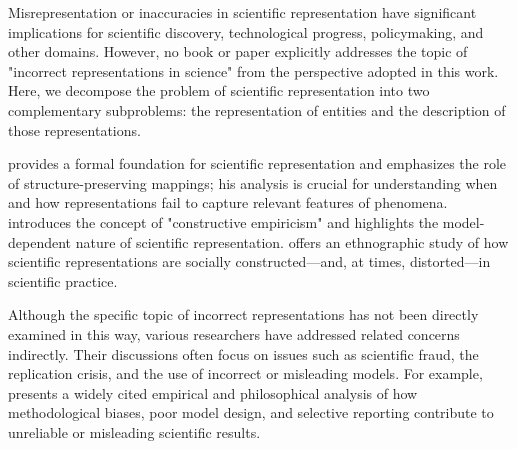 Misrepresentation or inaccuracies in scientific representation have significant implications for scientific discovery, technological progress, policymaking, and other domains. However, no book or paper explicitly addresses the topic of "incorrect representations in science" from the perspective adopted in this work. Here, we decompose the problem of scientific representation into two complementary subproblems: the representation of entities and the description of those representations.

\cite{suppes2002representation} provides a formal foundation for scientific representation and emphasizes the role of structure-preserving mappings; his analysis is crucial for understanding when and how representations fail to capture relevant features of phenomena. \cite{van1980scientific} introduces the concept of "constructive empiricism" and highlights the model-dependent nature of scientific representation. \cite{latour2013laboratory} offers an ethnographic study of how scientific representations are socially constructed—and, at times, distorted—in scientific practice.

Although the specific topic of incorrect representations has not been directly examined in this way, various researchers have addressed related concerns indirectly. Their discussions often focus on issues such as scientific fraud, the replication crisis, and the use of incorrect or misleading models. For example, \cite{ioannidis2005most} presents a widely cited empirical and philosophical analysis of how methodological biases, poor model design, and selective reporting contribute to unreliable or misleading scientific results.






